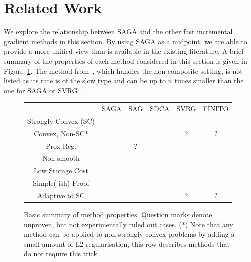 \documentclass{article}
\newcommand{\cmark}{\ding{51}}
\newcommand{\xmark}{\ding{55}}
\begin{document}
\section{Related Work}
\label{sec:related-work}
\vspace{-2mm}
We explore the relationship between SAGA and the other fast incremental gradient methods in this section. By using SAGA as a midpoint, we are able to provide a more unified view than is available in the existing literature. A brief summary of the properties of each method considered in this section is given in Figure~\ref{fig:comparison-table}. The method from~\citep{jota}, which handles the non-composite setting, is not listed as its rate is of the slow type and can be up to $n$ times smaller than the one for SAGA or SVRG~\citep{svrg}.

\begin{figure}[t]
\center
\small
\begin{tabular*}{\textwidth}{@{\extracolsep{\fill}} |cccccc|}
\hline 
 & SAGA & SAG & SDCA & SVRG & FINITO \tabularnewline
Strongly Convex (SC) & \cmark & \cmark & \cmark & \cmark & \cmark \tabularnewline
Convex, Non-SC* & \cmark & \cmark & \xmark & ? & ? \tabularnewline
Prox Reg. & \cmark & ? & \cmark \cite{sdca-admm} & \cmark & \xmark \tabularnewline 
Non-smooth & \xmark & \xmark & \cmark & \xmark & \xmark \tabularnewline
Low Storage Cost & \xmark & \xmark & \xmark & \cmark & \xmark \tabularnewline
Simple(-ish) Proof & \cmark & \xmark & \cmark & \cmark & \cmark \tabularnewline 
Adaptive to SC & \cmark & \cmark & \xmark & ? & ? \tabularnewline
\hline
\end{tabular*}
\vskip -0.1in
\caption{\small \label{fig:comparison-table} Basic summary of method properties. Question marks denote unproven, but not experimentally ruled out cases. (*) Note that any method can be applied to non-strongly convex problems by adding a small amount of L2 regularisation, this row describes methods that do not require this trick. \vspace{-3mm}}
\end{figure}
\end{document}
